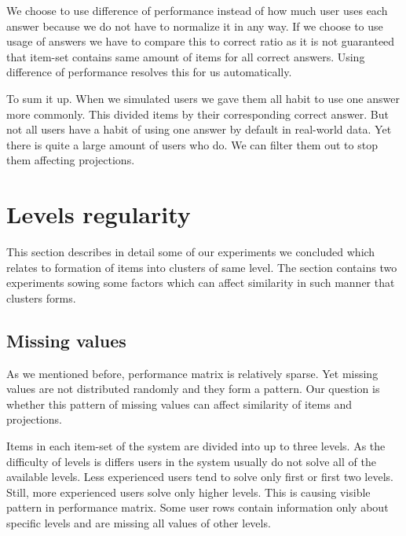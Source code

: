 \documentclass[
  digital, %
  table,   %
  nolof,     %
  nolot,     %
  nocover,
  color,
  final, %
]{fithesis3}
\begin{document}
We choose to use difference of performance instead of how much user uses each answer because we do not have to normalize it in any way. If we choose to use usage of answers we have to compare this to correct ratio as it is not guaranteed that item-set contains same amount of items for all correct answers. Using difference of performance resolves this for us automatically.


To sum it up. When we simulated users we gave them all habit to use one answer more commonly. This divided items by their corresponding correct answer. But not all users have a habit of using one answer by default in real-world data. Yet there is quite a large amount of users who do. We can filter them out to stop them affecting projections.


\section{Levels regularity}\label{evaulation-levels-regularity}

This section describes in detail some of our experiments we concluded which relates to formation of items into clusters of same level. The section contains two experiments sowing some factors which can affect similarity in such manner that clusters forms.


\subsection{Missing values}\label{missing-values}


As we mentioned before, performance matrix is relatively sparse. Yet missing values are not distributed randomly and they form a pattern. Our question is whether this pattern of missing values can affect similarity of items and projections.


Items in each item-set of the system are divided into up to three levels. As the difficulty of levels is differs users in the system usually do not solve all of the available levels. Less experienced users tend to solve only first or first two levels. Still, more experienced users solve only higher levels. This is causing visible pattern in performance matrix. Some user rows contain information only about specific levels and are missing all values of other levels.
\end{document}
